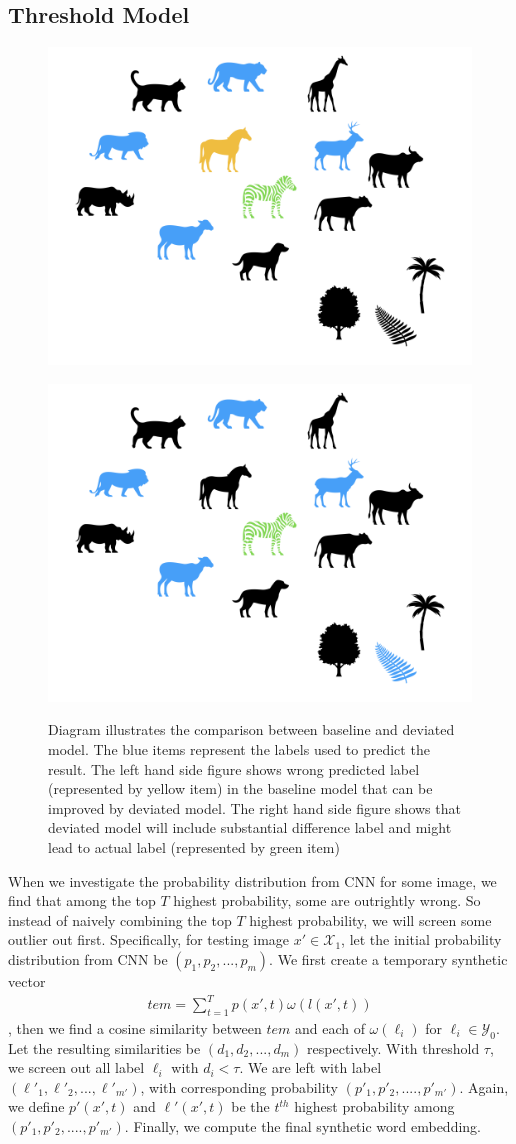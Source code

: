 \documentclass[11pt,letterpaper]{article}
\begin{document}
\subsection{Threshold Model}
\begin{figure}[ht]
        \centering
        \begin{frame}        {\includegraphics[width=0.48\columnwidth]{thm01.png}}
        \end{frame}\hfill
        \begin{frame}
 {\includegraphics[width=0.48\columnwidth]{thm02.png}}
        \end{frame}
        \caption{Diagram illustrates the comparison between baseline and deviated model. The blue items represent the labels used to predict the result. The left hand side figure shows wrong predicted label (represented by yellow item) in the baseline model that can be improved by deviated model. The right hand side figure shows that deviated model will include substantial difference label and might lead to actual label (represented by green item)  
                \label{fig:thm}    
        }
\end{figure}

When we investigate the probability distribution from CNN for some image, we find that among the top $T$ highest probability, some are outrightly wrong. So instead of naively combining the top $T$ highest probability, we will screen some outlier out first. Specifically, for testing image $x' \in \mathcal{X}_1$, let the initial probability distribution from CNN be $(p_1,p_2,...,p_m)$. We first create a temporary synthetic vector 
\begin{align*}
tem  = \sum\limits_{t = 1}^T p(x',t) \omega(l(x',t))
\end{align*} 
, then we find a cosine similarity between $tem$ and each of $\omega(\ell_i)$ for $\ell_i \in \mathcal{Y}_0$. Let the resulting similarities be $(d_1,d_2,...,d_m)$ respectively. With threshold $\tau$, we screen out all label $\ell_i$ with $d_i < \tau$. We are left with label $(\ell'_1,\ell'_2,...,\ell'_{m'})$, with corresponding probability $(p'_1,p'_2,....,p'_{m'})$. Again, we define $p'(x',t)$ and $\ell'(x',t)$ be the $t^{th}$ highest probability among $(p'_1,p'_2,....,p'_{m'})$. Finally, we compute the final synthetic word embedding.
\end{document}
